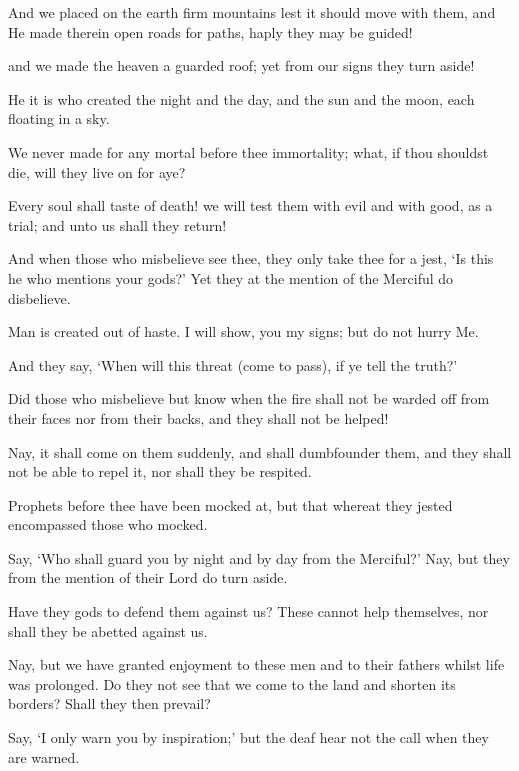 \documentclass[fontsize=14pt, letterpaper, notitlepage, openany, DIV=12]{scrbook} %
\begin{document}
\noindent[21:31]
And we placed on the earth firm mountains lest it should move with them, and He made
therein open roads for paths, haply they may be guided!

\noindent[21:32]
and we made the heaven a guarded roof; yet from our signs they turn aside!

\noindent[21:33]
He it is who created the night and the day, and the sun and the moon, each floating in a
sky.

\noindent[21:34]
We never made for any mortal before thee immortality; what, if thou shouldst die, will
they live on for aye?

\noindent[21:35]
Every soul shall taste of death! we will test them with evil and with good, as a trial; and
unto us shall they return!

\noindent[21:36]
And when those who misbelieve see thee, they only take thee for a jest, `Is this he who
mentions your gods?' Yet they at the mention of the Merciful do disbelieve.

\noindent[21:37]
Man is created out of haste. I will show, you my signs; but do not hurry Me.

\noindent[21:38]
And they say, `When will this threat (come to pass), if ye tell the truth?'

\noindent[21:39]
Did those who misbelieve but know when the fire shall not be warded off from their faces
nor from their backs, and they shall not be helped!

\noindent[21:40]
Nay, it shall come on them suddenly, and shall dumbfounder them, and they shall not be
able to repel it, nor shall they be respited.

\noindent[21:41]
Prophets before thee have been mocked at, but that whereat they jested encompassed
those who mocked.

\noindent[21:42]
Say, `Who shall guard you by night and by day from the Merciful?' Nay, but they from
the mention of their Lord do turn aside.

\noindent[21:43]
Have they gods to defend them against us? These cannot help themselves, nor shall they
be abetted against us.

\noindent[21:44]
Nay, but we have granted enjoyment to these men and to their fathers whilst life was
prolonged. Do they not see that we come to the land and shorten its borders? Shall they then
prevail?

\noindent[21:45]
Say, `I only warn you by inspiration;' but the deaf hear not the call when they are
warned.
\end{document}
